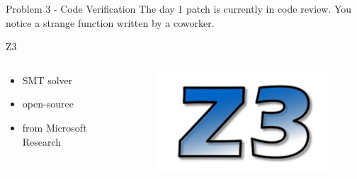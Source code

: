 \documentclass{beamer}
\begin{document}
\begin{frame}{Problem 3 - Code Verification}
The day 1 patch is currently in code review. You notice a strange function written by a coworker.

\end{frame}

\begin{frame}{Z3}
\begin{columns}
\begin{column}{0.5\textwidth}
	\begin{itemize}
		\item SMT solver
		\item open-source
		\item from Microsoft Research
	\end{itemize}
\end{column}
\begin{column}{0.5\textwidth}
	\begin{figure}
		\includegraphics[scale=0.3]{../Images/z3logo.png}
	\end{figure}
\end{column}

\end{columns}



\end{frame}

	
\end{document}

